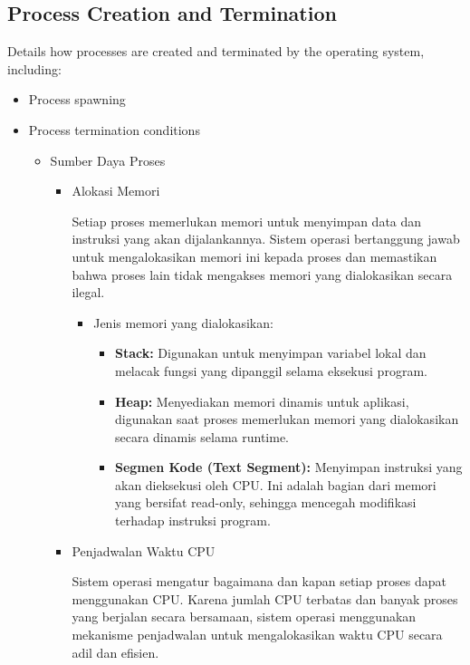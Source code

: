 \documentclass[12pt]{article}
\begin{document}
\subsection{Process Creation and Termination}
Details how processes are created and terminated by the operating system, including:
\begin{itemize}
    \item Process spawning
    \item Process termination conditions
    \begin{itemize}
        \item Sumber Daya Proses
    \begin{itemize}
        \item Alokasi Memori
        
        Setiap proses memerlukan memori untuk menyimpan data dan instruksi yang akan dijalankannya. Sistem operasi bertanggung jawab untuk mengalokasikan memori ini kepada proses dan memastikan bahwa proses lain tidak mengakses memori yang dialokasikan secara ilegal.
        
        \begin{itemize}
            \item Jenis memori yang dialokasikan:
                \begin{itemize}
                    \item \textbf{Stack:} Digunakan untuk menyimpan variabel lokal dan melacak fungsi yang dipanggil selama eksekusi program.
                    \item \textbf{Heap:} Menyediakan memori dinamis untuk aplikasi, digunakan saat proses memerlukan memori yang dialokasikan secara dinamis selama runtime.
                    \item \textbf{Segmen Kode (Text Segment):} Menyimpan instruksi yang akan dieksekusi oleh CPU. Ini adalah bagian dari memori yang bersifat read-only, sehingga mencegah modifikasi terhadap instruksi program.
                \end{itemize}
        \end{itemize}
        
        \item Penjadwalan Waktu CPU
        
        Sistem operasi mengatur bagaimana dan kapan setiap proses dapat menggunakan CPU. Karena jumlah CPU terbatas dan banyak proses yang berjalan secara bersamaan, sistem operasi menggunakan mekanisme penjadwalan untuk mengalokasikan waktu CPU secara adil dan efisien.
        

\end{itemize}
\end{itemize}
\end{itemize}
\end{document}
